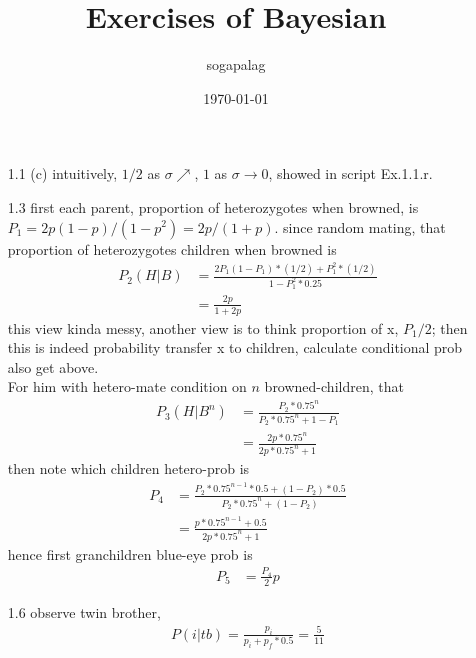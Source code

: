 \documentclass[paper=a4, fontsize=11pt]{scrartcl} %
\title{Exercises of Bayesian}
\author{sogapalag}
\date{\normalsize\today}
\numberwithin{equation}{section} %
\numberwithin{figure}{section} %
\numberwithin{table}{section} %
\begin{document}
\maketitle
\begin{itemize}
	\item[1.1] (c) intuitively, $1/2$ as $\sigma \nearrow$, $1$ as $\sigma\rightarrow 0$, showed in script Ex.1.1.r.
	\item[1.3] first each parent, proportion of heterozygotes when browned, is $P_1=2p(1-p)/(1-p^2)= 2p/(1+p)$. since random mating, that proportion of heterozygotes children when browned is
	\begin{align}
		P_2(H|B) &= \frac{2P_1(1-P_1)*(1/2)+ P_1^2*(1/2)}{1-P_1^2*0.25}\\
			&= \frac{2p}{1+2p}
	\end{align}
	this view kinda messy, another view is to think proportion of x, $P_1/2$; then this is indeed probability transfer x to children, calculate conditional prob also get above.\\
	For him with hetero-mate condition on $n$ browned-children, that
	\begin{align}
		P_3(H|B^n) &= \frac{P_2* 0.75^n}{P_2*0.75^n+ 1-P_1}\\
			&= \frac{2p*0.75^n}{2p*0.75^n+1}
	\end{align}
	then note which children hetero-prob is
	\begin{align}
		P_4 &= \frac{P_2*0.75^{n-1}*0.5+(1-P_2)*0.5}{P_2*0.75^n + (1-P_2)}\\
			&= \frac{p*0.75^{n-1}+0.5}{2p*0.75^n+1}
	\end{align}
	hence first granchildren blue-eye prob is
	\begin{align}
		P_5 &= \frac{P_4}{2}p
	\end{align}
	\item[1.6] observe twin brother,
	\begin{align}
		P(i|tb) = \frac{p_i}{p_i+p_f*0.5}=\frac{5}{11}
	\end{align}
\end{itemize}
\end{document}
